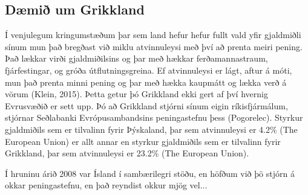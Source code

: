 \documentclass[a4paper]{article}
\begin{document}
\subsection{Dæmið um Grikkland}

Í venjulegum kringumstæðum þar sem land hefur hefur fullt vald yfir gjaldmiðli sínum mun það bregðast við miklu atvinnuleysi með því að prenta meiri pening. Það lækkar virði gjaldmiðilsins og þar með hækkar ferðamannastraum, fjárfestingar, og gróða útflutningsgreina. Ef atvinnuleysi er lágt, aftur á móti, mun það prenta minni pening og þar með hækka kaupmátt og lækka verð á vörum (Klein, 2015). Þetta getur þó Grikkland ekki gert af því hvernig Evrusvæðið er sett upp. Þó að Grikkland stjórni sínum eigin ríkisfjármálum, stjórnar Seðlabanki Evrópusambandsins  peningastefnu þess (Pogorelec). Styrkur gjaldmiðils sem er tilvalinn fyrir Þýskaland, þar sem atvinnuleysi er 4.2\% (The European Union) er allt annar en styrkur gjaldmiðils sem er tilvalinn fyrir Grikkland, þar sem atvinnuleysi er 23.2\% (The European Union).

Í hruninu árið 2008 var Ísland í sambærilegri stöðu, en höfðum við þö stjórn á okkar peningastefnu, en það reyndist okkur mjög vel...



\end{document}
